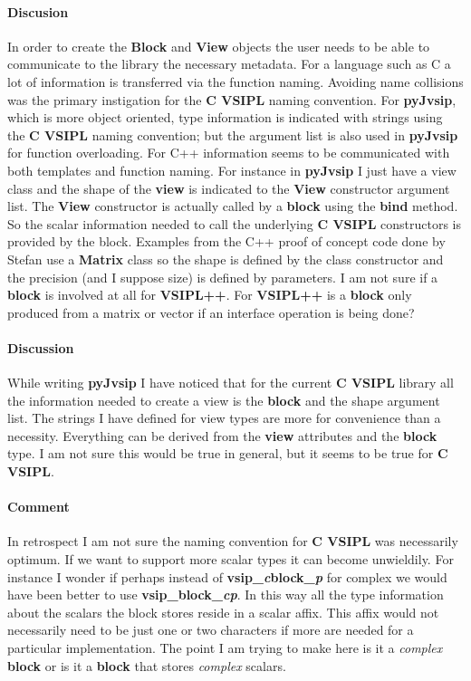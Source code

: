 \documentclass[11pt, oneside]{article}
\newcommand{\cvl}{\ttbf{C VSIPL}}
\newcommand{\pyjv}{{\ttbf{pyJvsip}}}
\newcommand{\ttbf}[1]{{\ttfamily \bfseries #1}}
\newcommand{\Blk}{\ttbf{Block}}
\newcommand{\blk}{\ttbf{block}}
\newcommand{\Vw}{\ttbf{View}}
\newcommand{\vw}{\ttbf{view}}
\begin{document}
\paragraph{Discusion}
In order to create the \Blk{} and \Vw{} objects the user needs to be able to communicate to the library the necessary metadata.  For a language such as C a lot of information is transferred via the function naming. Avoiding name collisions was the primary instigation for the \cvl{} naming convention.  For \pyjv{}, which is more object oriented, type information is indicated with strings using the \cvl{} naming convention; but the argument list is also used in \pyjv{} for function overloading.  For C++  information seems to be communicated with both templates and function naming.  For instance in \pyjv{} I just have a view class and the shape of  the \vw{} is indicated to the \Vw{} constructor argument list. The \Vw{} constructor is actually called by a \blk{} using the \ttbf{bind} method. So the scalar information needed to call the underlying \cvl{} constructors is provided by the block. Examples from the C++ proof of concept code done by Stefan use a \ttbf{Matrix} class so the shape is defined by the class constructor and the precision (and I suppose size) is defined by parameters. I am not sure if a \blk{} is involved at all for \ttbf{VSIPL++}. For \ttbf{VSIPL++} is a \blk{} only produced from a matrix or vector if an interface operation is being done?
\paragraph{Discussion}
While writing \pyjv{} I have noticed that for the current \cvl{} library all the information needed to create a view is the \ttbf{block} and the shape argument list.  The strings I have defined for view types are more for convenience than a necessity. Everything can be derived from the \vw{} attributes and the \blk{} type. I am not sure this would be true in general, but it seems to be true for \cvl{}.
\paragraph{Comment} In retrospect I am not sure the naming convention for \cvl{} was necessarily optimum. If we want to support more scalar types it can become unwieldily.  For instance I wonder if perhaps instead of \ttbf{vsip\_\emph{c}block\_\emph{p}} for complex we would have been better to use \ttbf{vsip\_block\_\emph{cp}}. In this way all the type information about the scalars the block stores reside in a scalar affix.  This affix would not necessarily need to be just one or two characters if more are needed for a particular implementation.  The point I am trying to make here is it a \emph{complex} \blk{} or is it a \blk{} that stores \emph{complex} scalars.
\end{document}
